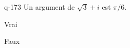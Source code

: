 \begin{truefalse}{q-173}
Un argument de $\sqrt{3}+i$ est $\pi/6$.
\item* Vrai
\item Faux
\end{truefalse}

